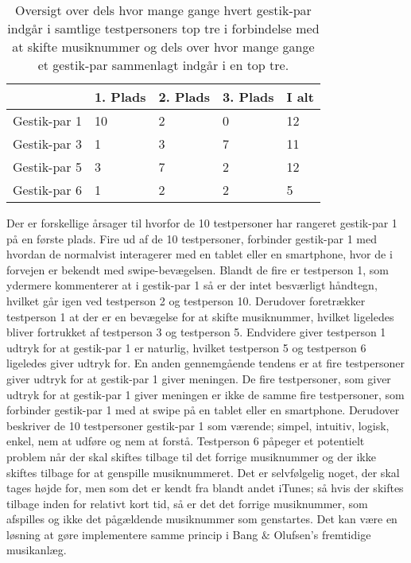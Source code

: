 %
\begin{table}[H]
	\centering
	\begin{tabular}{ | p{2.4cm} | p{2.4cm} | p{2.4cm} | p{2.4cm} |p{2.4cm}|}
		\hline
		& 1. Plads & 2. Plads & 3. Plads & I alt \\ \hline
		Gestik-par 1 & 10 & 2 & 0 & 12\\ \hline
		Gestik-par 3 & 1 & 3 & 7 & 11\\ \hline
		Gestik-par 5 & 3 & 7 & 2 & 12\\ \hline 
		Gestik-par 6 & 1 & 2 & 2 & 5\\ \hline
	\end{tabular}
	\caption{Oversigt over dels hvor mange gange hvert gestik-par indgår i samtlige testpersoners top tre i forbindelse med at skifte musiknummer og dels over hvor mange gange et gestik-par sammenlagt indgår i en top tre.}
	\label{tab:GestikParITopTreSkiftOversigt}
\end{table}
\noindent
%
Der er forskellige årsager til hvorfor de 10 testpersoner har rangeret gestik-par 1 på en første plads. Fire ud af de 10 testpersoner, forbinder gestik-par 1 med hvordan de normalvist interagerer med en tablet eller en smartphone, hvor de i forvejen er bekendt med swipe-bevægelsen. Blandt de fire er testperson 1, som ydermere kommenterer at i gestik-par 1 så er der intet besværligt håndtegn, hvilket går igen ved testperson 2 og testperson 10. Derudover foretrækker testperson 1 at der er en bevægelse for at skifte musiknummer, hvilket ligeledes bliver fortrukket af testperson 3 og testperson 5. Endvidere giver testperson 1 udtryk for at gestik-par 1 er naturlig, hvilket testperson 5 og testperson 6 ligeledes giver udtryk for. En anden gennemgående tendens er at fire testpersoner giver udtryk for at gestik-par 1 giver meningen. De fire testpersoner, som giver udtryk for at gestik-par 1 giver meningen er ikke de samme fire testpersoner, som forbinder gestik-par 1 med at swipe på en tablet eller en smartphone. Derudover beskriver de 10 testpersoner gestik-par 1 som værende; simpel, intuitiv, logisk, enkel, nem at udføre og nem at forstå. Testperson 6 påpeger et potentielt problem når der skal skiftes tilbage til det forrige musiknummer og der ikke skiftes tilbage for at genspille musiknummeret. Det er selvfølgelig noget, der skal tages højde for, men som det er kendt fra blandt andet iTunes; så hvis der skiftes tilbage inden for relativt kort tid, så er det det forrige musiknummer, som afspilles og ikke det pågældende musiknummer som genstartes. Det kan være en løsning at gøre implementere samme princip i Bang $\&$ Olufsen's fremtidige musikanlæg. 

